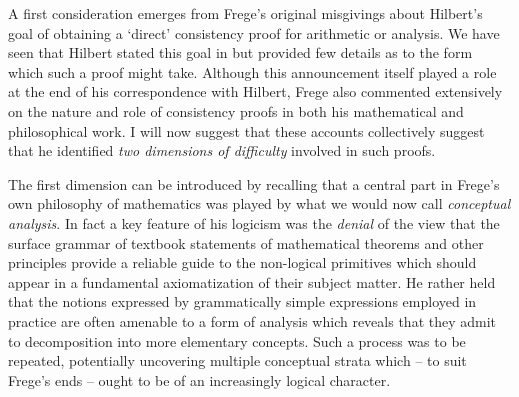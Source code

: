 \documentclass[11pt,fleqn,leqno]{article}
\begin{document}
A first consideration emerges from Frege's original misgivings about Hilbert's goal of obtaining a `direct' consistency proof for arithmetic or analysis.  We have seen that Hilbert stated this goal in \citeyearpar{Hilbert1900} but provided few details as to the form which such a proof might take.   Although this announcement itself played a role at the end of his correspondence with Hilbert, Frege also commented extensively on the nature and role of consistency proofs in both his mathematical and philosophical work.  I will now suggest that these accounts collectively suggest that he identified \textsl{two dimensions of difficulty} involved in such proofs.  

The first dimension can be introduced by recalling that a central part in Frege's own philosophy of mathematics was played by what we would now call \textsl{conceptual analysis}.   In fact a key feature of his logicism was the \textsl{denial} of the view that the surface grammar of textbook statements of mathematical theorems and other principles provide a reliable guide to the non-logical primitives which should appear in a fundamental axiomatization of their subject matter.   He rather held that the notions expressed by grammatically simple expressions employed in practice are often amenable to a form of analysis which reveals that they admit to decomposition into more elementary concepts.    Such a process was to be repeated, potentially uncovering multiple conceptual strata which -- to suit Frege's ends -- ought to be of an increasingly logical character.  
\end{document}
